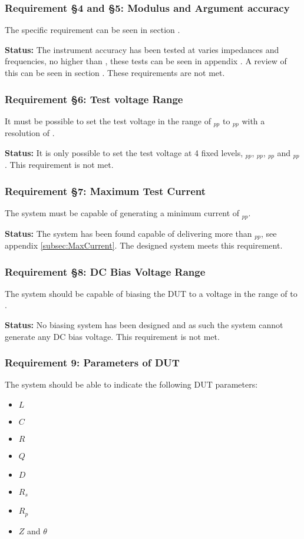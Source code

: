 \subsubsection*{Requirement §4 and §5: Modulus and Argument accuracy}
The specific requirement can be seen in section .

\textbf{Status:} The instrument accuracy has been tested at varies impedances and frequencies, no higher than , these tests can be seen in appendix . A review of this can be seen in section . These requirements are not met.
\nl
\nl

\subsubsection*{Requirement §6: Test voltage Range}
It must be possible to set the test voltage in the range of $_{pp}$ to $_{pp}$ with a resolution of .

\textbf{Status:} It is only possible to set the test voltage at 4 fixed levels, $_{pp}$, $_{pp}$, $_{pp}$ and $_{pp}$. This requirement is not met.
\nl
\nl

\subsubsection*{Requirement §7: Maximum Test Current}
The system must be capable of generating a minimum current of $_{pp}$.

\textbf{Status:} The system has been found capable of delivering more than $_{pp}$, see appendix \ref{subsec:MaxCurrent}. The designed system meets this requirement.
\nl
\nl

\subsubsection*{Requirement §8: DC Bias Voltage Range}
The system should be capable of biasing the DUT to a voltage in the range of  to .

\textbf{Status:} No biasing system has been designed and as such the system cannot generate any DC bias voltage. This requirement is not met.
\nl
\nl

\subsubsection*{Requirement 9: Parameters of DUT}
The system should be able to indicate the following DUT parameters:
\begin{itemize}
    \item $L$
    \item $C$
    \item $R$
    \item $Q$
    \item $D$
    \item $R_s$
    \item $R_p$
    \item $Z$ and $\theta$
\end{itemize}

